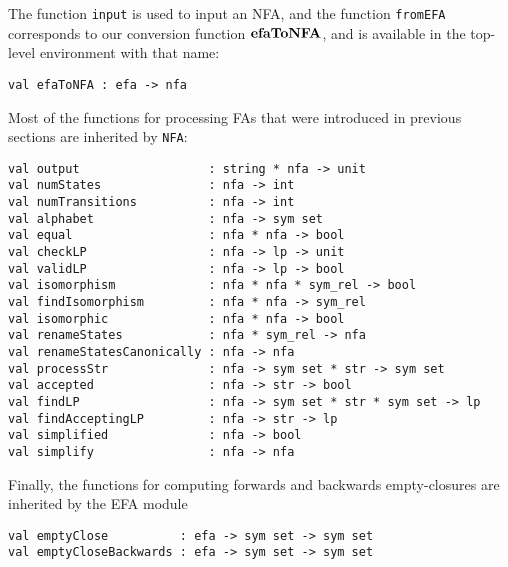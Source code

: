 The function \texttt{input} is used to input an NFA, and
the function \texttt{fromEFA} corresponds to our
conversion function $\mathbf{efaToNFA}$, and is available in the top-level
environment with that name:
\begin{verbatim}
val efaToNFA : efa -> nfa
\end{verbatim}
%

Most of the functions for processing FAs that were introduced
in previous sections are inherited by \texttt{NFA}:
\begin{verbatim}
val output                  : string * nfa -> unit 
val numStates               : nfa -> int
val numTransitions          : nfa -> int
val alphabet                : nfa -> sym set
val equal                   : nfa * nfa -> bool
val checkLP                 : nfa -> lp -> unit
val validLP                 : nfa -> lp -> bool
val isomorphism             : nfa * nfa * sym_rel -> bool
val findIsomorphism         : nfa * nfa -> sym_rel
val isomorphic              : nfa * nfa -> bool
val renameStates            : nfa * sym_rel -> nfa
val renameStatesCanonically : nfa -> nfa
val processStr              : nfa -> sym set * str -> sym set
val accepted                : nfa -> str -> bool
val findLP                  : nfa -> sym set * str * sym set -> lp
val findAcceptingLP         : nfa -> str -> lp
val simplified              : nfa -> bool
val simplify                : nfa -> nfa
\end{verbatim}
%
%
%
%
%
%
%
%
%
%
%
%
%
%
%
%
%
%
Finally, the functions for computing forwards and backwards
empty-closures are inherited by the EFA module
\begin{verbatim}
val emptyClose          : efa -> sym set -> sym set
val emptyCloseBackwards : efa -> sym set -> sym set
\end{verbatim}
%
%

